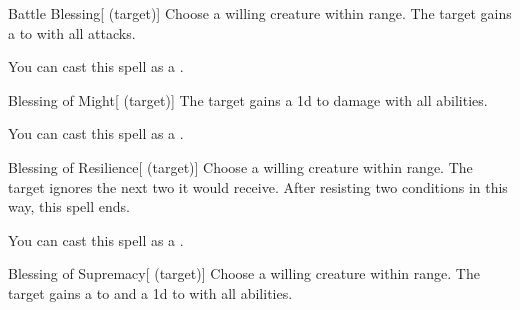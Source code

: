 \lowercase{\hypertarget{spell:Battle Blessing}{}}\label{spell:Battle Blessing}
\begin{attuneability}[\nth{2}]{\hypertarget{spell:Battle Blessing}{Battle Blessing}}[ (target)]
Choose a willing creature within \rngclose range.
The target gains a   to  with all attacks.

You can cast this spell as a .
\end{attuneability}
\vspace{0.25em}



\lowercase{\hypertarget{spell:Blessing of Might}{}}\label{spell:Blessing of Might}
\begin{attuneability}[\nth{3}]{\hypertarget{spell:Blessing of Might}{Blessing of Might}}[ (target)]
The target gains a \plus1d  to damage with all abilities.

You can cast this spell as a .
\end{attuneability}
\vspace{0.25em}



\lowercase{\hypertarget{spell:Blessing of Resilience}{}}\label{spell:Blessing of Resilience}
\begin{attuneability}[\nth{3}]{\hypertarget{spell:Blessing of Resilience}{Blessing of Resilience}}[ (target)]
Choose a willing creature within \rngclose range.
The target ignores the next two  it would receive.
After resisting two conditions in this way, this spell ends.

You can cast this spell as a .
\end{attuneability}
\vspace{0.25em}



\lowercase{\hypertarget{spell:Blessing of Supremacy}{}}\label{spell:Blessing of Supremacy}
\begin{attuneability}[\nth{4}]{\hypertarget{spell:Blessing of Supremacy}{Blessing of Supremacy}}[ (target)]
Choose a willing creature within \rngclose range.
The target gains a   to  and a \plus1d  to  with all abilities.
\end{attuneability}
\vspace{0.25em}



